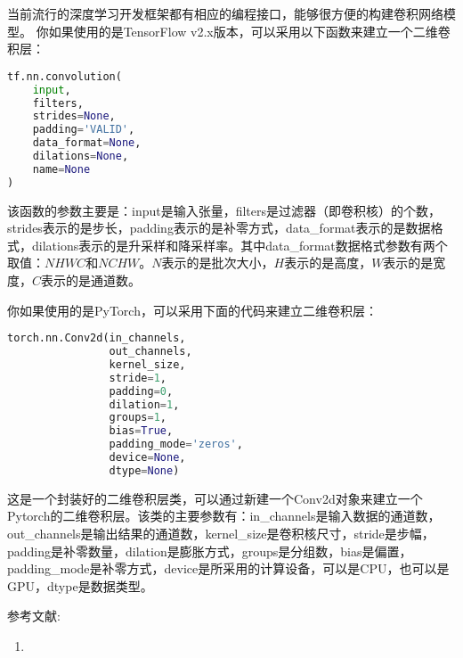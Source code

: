 当前流行的深度学习开发框架都有相应的编程接口，能够很方便的构建卷积网络模型。
你如果使用的是TensorFlow v2.x版本，可以采用以下函数来建立一个二维卷积层：
\begin{lstlisting}[language=python]
tf.nn.convolution(
    input,
    filters,
    strides=None,
    padding='VALID',
    data_format=None,
    dilations=None,
    name=None
)
\end{lstlisting}
该函数的参数主要是：input是输入张量，filters是过滤器（即卷积核）的个数，strides表示的是步长，padding表示的是补零方式，data_format表示的是数据格式，dilations表示的是升采样和降采样率。其中data_format数据格式参数有两个取值：$NHWC$和$NCHW$。$N$表示的是批次大小，$H$表示的是高度，$W$表示的是宽度，$C$表示的是通道数。

你如果使用的是PyTorch，可以采用下面的代码来建立二维卷积层：
\begin{lstlisting}[language=python]
torch.nn.Conv2d(in_channels, 
                out_channels, 
                kernel_size,
                stride=1, 
                padding=0,
                dilation=1,
                groups=1,
                bias=True,
                padding_mode='zeros',
                device=None,
                dtype=None)
\end{lstlisting}
这是一个封装好的二维卷积层类，可以通过新建一个Conv2d对象来建立一个Pytorch的二维卷积层。该类的主要参数有：in_channels是输入数据的通道数，out_channels是输出结果的通道数，kernel_size是卷积核尺寸，stride是步幅，padding是补零数量，dilation是膨胀方式，groups是分组数，bias是偏置，padding_mode是补零方式，device是所采用的计算设备，可以是CPU，也可以是GPU，dtype是数据类型。


参考文献:
\begin{enumerate}
\item 
\end{enumerate}